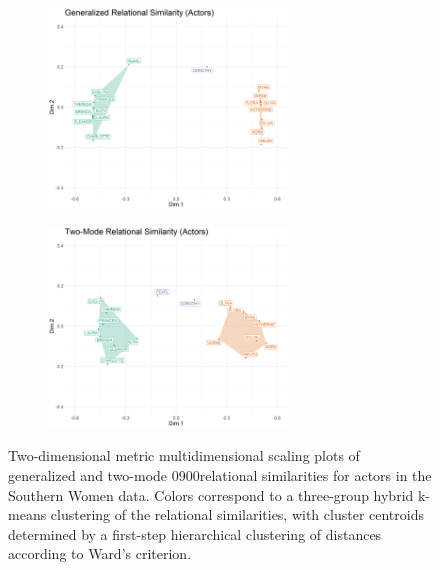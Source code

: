 \documentclass[a4paper,fleqn]{cas-sc}
\begin{document}
\begin{figure}[ht!]
    \begin{subfigure}[b]{1.0\textwidth}
        \centering
        \includegraphics[width=0.7\textwidth]{Plots/grs-actors-sw.png}
        \caption{}
        \label{fig:grs-actors-sw}
    \end{subfigure} 
    \begin{subfigure}[b]{1.0\textwidth}
        \centering
        \includegraphics[width=0.7\textwidth]{Plots/tmrs-actors-sw.png}
        \caption{}
        \label{fig:tmrs-actors-sw}
    \end{subfigure} 
    \caption{Two-dimensional metric multidimensional scaling plots of generalized and two-mode 0900relational similarities for actors in the Southern Women data. Colors correspond to a three-group hybrid k-means clustering of the relational similarities, with cluster centroids determined by a first-step hierarchical clustering of distances according to Ward's \citeyearpar{ward63} criterion.}
    \label{fig:actors-sw}
 \end{figure}
\end{document}
